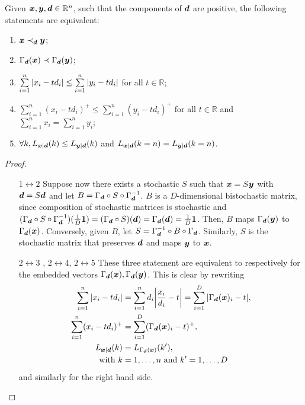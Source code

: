 \begin{theorem}
Given $\bm{x}, \bm{y}, \bm{d} \in \mathbb{R}^n$, such that the components of $\bm{d}$ are positive, the following statements are equivalent:
 \begin{enumerate}%
	\item $\bm{x} \prec_{\bm{d}} \bm{y}$;
	\item $\Gamma_{\bm{d}}({\bm{x}}) \prec \Gamma_{\bm{d}}({\bm{y}})$;
	\item\label{en:tm3} $\sum\limits_{i=1}^n \abs{x_i - t d_i} \leq \sum\limits_{i=1}^n \abs{y_i - t d_i}$ for all $t \in \mathbb{R}$;
	\item $\sum\limits_{i=1}^n (x_i - t d_i)^+ \leq \sum\limits_{i=1}^n (y_i - t d_i)^+$ for all $t \in \mathbb{R}$ and $\sum\limits_{i=1}^n x_i = \sum\limits_{i=1}^n y_i$;
	\item $\forall k, L_{\bm{x}|\bm{d}}(k) \leq L_{\bm{y}|\bm{d}}(k)$ and $L_{\bm{x}|\bm{d}}(k=n) = L_{\bm{y}|\bm{d}}(k=n)$.
 \end{enumerate}
\end{theorem}
\begin{proof}
    \begin{enumerate}
        \item[1$\leftrightarrow2$]
        Suppose now there exists a stochastic $S$ such that $\bm{x} = S\bm{y}$ with $\bm{d} = S\bm{d}$ and let $B = \Gamma_{\bm{d}} \circ S \circ \Gamma_{\bm{d}}^{-1}$.
        $B$ is a $D$-dimensional bistochastic matrix, since composition of stochastic matrices is stochastic and $(\Gamma_{\bm{d}} \circ S \circ \Gamma_{\bm{d}}^{-1}) (\frac{1}{D}\bm{1}) = (\Gamma_{\bm{d}} \circ S) (\bm{d}) = \Gamma_{\bm{d}}(\bm{d}) = \frac{1}{D}\bm{1}$. Then, $B$ maps $\Gamma_{\bm{d}}({\bm{y}})$ to $\Gamma_{\bm{d}}({\bm{x}})$.
        Conversely, given $B$, let $S = \Gamma_{\bm{d}}^{-1} \circ B \circ \Gamma_{\bm{d}}$.
        Similarly, $S$ is the stochastic matrix that preserves $\bm{d}$ and maps $\bm{y}$ to $\bm{x}$.
        \item[$2\leftrightarrow3$]\hspace{-5pt}, $2\leftrightarrow4$, $2\leftrightarrow5$ These three statement are equivalent to  respectively for the embedded vectors $\Gamma_{\bm{d}}({\bm{x}}), \Gamma_{\bm{d}}({\bm{y}})$.
        This is clear by rewriting
        \begin{align}
            \sum\limits_{i=1}^n \abs{x_i - t d_i} &= \sum\limits_{i=1}^n d_i \abs{\frac{x_i}{d_i} - t} = \sum\limits_{i=1}^D \abs{\Gamma_{\bm{d}}(\bm{x})_i - t}, \\
            \sum\limits_{i=1}^n (x_i - t d_i)^+ &= \sum\limits_{i=1}^D (\Gamma_{\bm{d}}(\bm{x})_i - t)^+, \\
            L_{\bm{x}|\bm{d}}(k) &= L_{\Gamma_{\bm{d}}(\bm{x})}(k'), \\
            \text{with}\ k&=1,\dots,n\ \text{and}\ k'=1,\dots,D \nonumber
        \end{align} 
        and similarly for the right hand side.
    \end{enumerate}
\end{proof}

